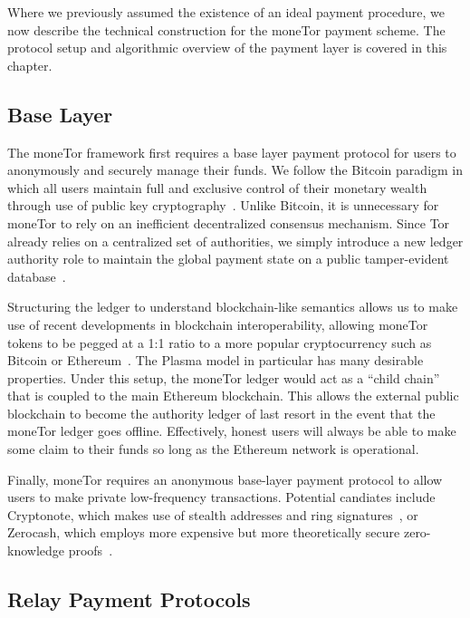 Where we previously assumed the existence of an ideal payment procedure, we now
describe the technical construction for the moneTor payment scheme. The protocol
setup and algorithmic overview of the payment layer is covered in this chapter.

\subsection{Base Layer}

The moneTor framework first requires a base layer payment protocol for users to
anonymously and securely manage their funds. We follow the Bitcoin paradigm in
which all users maintain full and exclusive control of their monetary wealth
through use of public key cryptography~\cite{nakamoto2008bitcoin}. Unlike
Bitcoin, it is unnecessary for moneTor to rely on an inefficient decentralized
consensus mechanism. Since Tor already relies on a centralized set of
authorities, we simply introduce a new ledger authority role to maintain the
global payment state on a public tamper-evident
database~\cite{crosby2009efficient}.

Structuring the ledger to understand blockchain-like semantics allows us to make
use of recent developments in blockchain interoperability, allowing moneTor
tokens to be pegged at a 1:1 ratio to a more popular cryptocurrency such as
Bitcoin or Ethereum~\cite{back2014enabling, poon2017plasma}. The Plasma model in
particular has many desirable properties. Under this setup, the moneTor ledger
would act as a ``child chain'' that is coupled to the main Ethereum
blockchain. This allows the external public blockchain to become the authority
ledger of last resort in the event that the moneTor ledger goes
offline. Effectively, honest users will always be able to make some claim to
their funds so long as the Ethereum network is operational.

Finally, moneTor requires an anonymous base-layer payment protocol to allow
users to make private low-frequency transactions. Potential candiates include
Cryptonote, which makes use of stealth addresses and ring
signatures~\cite{van2013cryptonote}, or Zerocash, which employs more expensive
but more theoretically secure zero-knowledge proofs~\cite{sasson2014zerocash}.

\subsection{Relay Payment Protocols}

